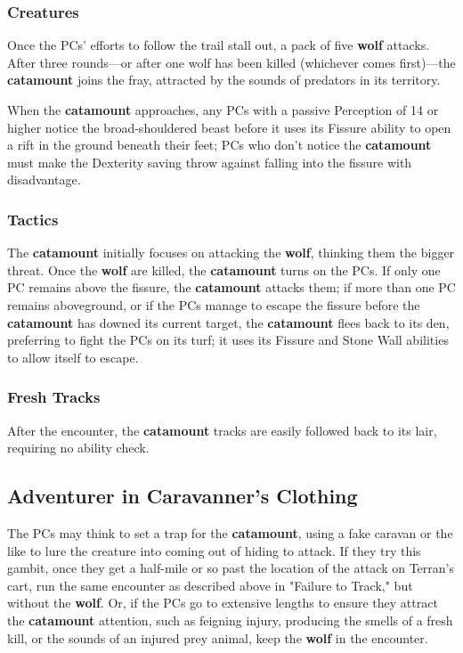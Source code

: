 \documentclass[10pt,a4paper,twoside,bg=print,twocolumn,openany,nodeprecatedcode]{dndbook}
\begin{document}
\subsubsection{Creatures}
Once the PCs' efforts to follow the trail stall out, a pack of five \textbf{wolf} attacks. After three rounds—or after one wolf has been killed (whichever comes first)—the \textbf{catamount} joins the fray, attracted by the sounds of predators in its territory.

When the \textbf{catamount} approaches, any PCs with a passive Perception of 14 or higher notice the broad-shouldered beast before it uses its Fissure ability to open a rift in the ground beneath their feet; PCs who don't notice the \textbf{catamount} must make the Dexterity saving throw against falling into the fissure with disadvantage.

\subsubsection{Tactics}
The \textbf{catamount} initially focuses on attacking the \textbf{wolf}, thinking them the bigger threat. Once the \textbf{wolf} are killed, the \textbf{catamount} turns on the PCs. If only one PC remains above the fissure, the \textbf{catamount} attacks them; if more than one PC remains aboveground, or if the PCs manage to escape the fissure before the \textbf{catamount} has downed its current target, the \textbf{catamount} flees back to its den, preferring to fight the PCs on its turf; it uses its Fissure and Stone Wall abilities to allow itself to escape.

\subsubsection{Fresh Tracks}
After the encounter, the \textbf{catamount} tracks are easily followed back to its lair, requiring no ability check.

\subsection{Adventurer in Caravanner's Clothing}
The PCs may think to set a trap for the \textbf{catamount}, using a fake caravan or the like to lure the creature into coming out of hiding to attack. If they try this gambit, once they get a half-mile or so past the location of the attack on Terran's cart, run the same encounter as described above in "Failure to Track," but without the \textbf{wolf}. Or, if the PCs go to extensive lengths to ensure they attract the \textbf{catamount} attention, such as feigning injury, producing the smells of a fresh kill, or the sounds of an injured prey animal, keep the \textbf{wolf} in the encounter.
\end{document}
